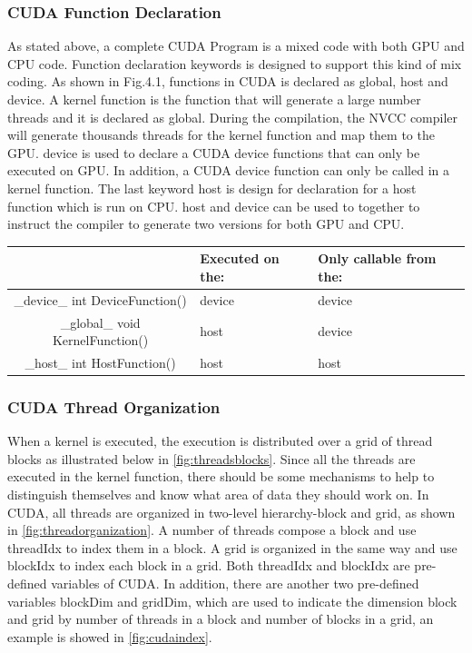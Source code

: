 \documentclass[Ingles]{ic-tese-v1}
\begin{document}
\subsubsection{CUDA Function Declaration}
\label{CUDAfunction}

As stated above, a complete CUDA Program is a mixed code with both GPU and CPU
code. Function declaration keywords is designed to support this kind of mix coding. As
shown in Fig.4.1, functions in CUDA is declared as global, host and device. A kernel
function is the function that will generate a large number threads and it is declared as
global. During the compilation, the NVCC compiler will generate thousands threads for
the kernel function and map them to the GPU. device is used to declare a CUDA device
functions that can only be executed on GPU. In addition, a CUDA device function can
only be called in a kernel function. The last keyword host is design for declaration for a
host function which is run on CPU. host and device can be used to together to instruct
the compiler to generate two versions for both GPU and CPU.


\begin{center}
	\begin{tabular}{ | c | >{\centering\arraybackslash}p{2cm} | >{\centering\arraybackslash}p{3cm} |}
		\hline
		 & Executed on the: & Only callable from the: \\ \hline
		{\color{blue} \_device\_} int DeviceFunction() & device & device \\ \hline
		{\color{blue} \_global\_} void KernelFunction()& host & device \\ \hline
		{\color{blue} \_host\_} int HostFunction() & host & host\\
		\hline
	\end{tabular}
\end{center}

\subsubsection{CUDA Thread Organization}
\label{CUDA Thread Organization}
When a kernel is executed, the execution is distributed over a grid of thread
blocks as illustrated below in \ref{fig:threadsblocks}. Since all the threads are executed in the kernel function, there should be some mechanisms to help to distinguish themselves and know what area of data they should work on. In CUDA, all threads are organized in two-level hierarchy-block and grid, as shown in \ref{fig:threadorganization}. A number of threads compose a block and use threadIdx to index them in a block. A grid is organized in the same way and use blockIdx to index each block in a grid. Both threadIdx and blockIdx are pre-defined variables of CUDA. In addition, there are another two pre-defined variables blockDim and gridDim, which are used to indicate the dimension block and grid by number of threads in a block and number of blocks in a grid, an example is showed in \ref{fig:cudaindex}.
\end{document}
